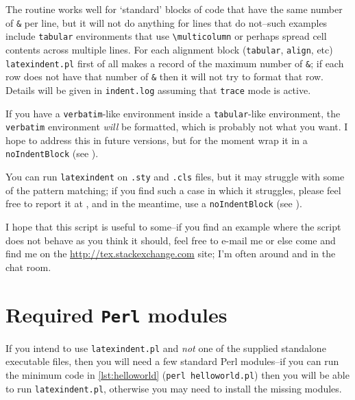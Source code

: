\documentclass[11pt]{article}
\begin{document}
The routine works well for `standard' blocks of code that have the same number of \lstinline!&!
per line, but it will not do anything for lines that do not--such examples
include \lstinline!tabular! environments that use \lstinline!\multicolumn! or
perhaps spread cell contents across multiple lines.  For each alignment block (\lstinline!tabular!,
\lstinline!align!, etc) \lstinline!latexindent.pl! first of all makes a record
of the maximum number of \lstinline!&!; if each row does not have that
number of \lstinline!&! then it will not try to format that row. Details
will be given in \lstinline!indent.log! assuming that \lstinline!trace! mode
is active.

If you have a \lstinline!verbatim!-like environment inside a \lstinline!tabular!-like
environment, the \lstinline!verbatim! environment \emph{will} be formatted, which
is probably not what you want. I hope to address this in future versions, but for the
moment wrap it in a \lstinline!noIndentBlock! (see ).

You can run \lstinline!latexindent! on \lstinline!.sty! and  \lstinline!.cls! files, but it may
struggle with some of the pattern matching; if you find such a case in which it struggles, please feel free 
to report it at \cite{latexindent-home}, and 
in the meantime, use a \lstinline!noIndentBlock! (see ).

I hope that this script is useful to some--if you find an example where the
script does not behave as you think it should, feel free to e-mail me or else
come and find me on the \url{http://tex.stackexchange.com} site; I'm often around
and in the chat room.

\nocite{*}
\printbibliography[heading=bibintoc,title={References},notkeyword=contributor]
\printbibliography[heading=bibintoc,title={Contributors},keyword=contributor]

\appendix
\section{Required \lstinline!Perl! modules}\label{sec:requiredmodules}
If you intend to use \lstinline!latexindent.pl! and \emph{not} one of the supplied standalone executable files, then you will need a few standard Perl modules--if you can run the
minimum code in \cref{lst:helloworld} (\lstinline!perl helloworld.pl!) then you will be able to run \lstinline!latexindent.pl!, otherwise you may
need to install the missing modules.
\end{document}
